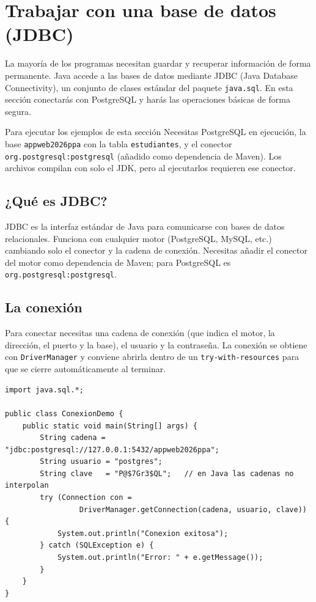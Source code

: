 \documentclass[11pt]{article}
\begin{document}
\section{Trabajar con una base de datos (JDBC)}
La mayoría de los programas necesitan guardar y recuperar información de forma permanente. Java accede a las bases de datos mediante JDBC (Java Database Connectivity), un conjunto de clases estándar del paquete \texttt{java.\allowbreak{}sql}. En esta sección conectarás con PostgreSQL y harás las operaciones básicas de forma segura.

\begin{cajawarn}{Para ejecutar los ejemplos de esta sección}
Necesitas PostgreSQL en ejecución, la base \texttt{appweb2026ppa} con la tabla \texttt{estudiantes}, y el conector \texttt{org.\allowbreak{}postgresql:\allowbreak{}postgresql} (añadido como dependencia de Maven). Los archivos compilan con solo el JDK, pero al ejecutarlos requieren ese conector.\par
\end{cajawarn}
\subsection{¿Qué es JDBC?}
JDBC es la interfaz estándar de Java para comunicarse con bases de datos relacionales. Funciona con cualquier motor (PostgreSQL, MySQL, etc.) cambiando solo el conector y la cadena de conexión. Necesitas añadir el conector del motor como dependencia de Maven; para PostgreSQL es \texttt{org.\allowbreak{}postgresql:\allowbreak{}postgresql}.

\subsection{La conexión}
Para conectar necesitas una cadena de conexión (que indica el motor, la dirección, el puerto y la base), el usuario y la contraseña. La conexión se obtiene con \texttt{Driver\allowbreak{}Manager} y conviene abrirla dentro de un \texttt{try-with-resources} para que se cierre automáticamente al terminar.

\begin{cajacodigo}
\begin{lstlisting}[style=java]
import java.sql.*;

public class ConexionDemo {
    public static void main(String[] args) {
        String cadena = "jdbc:postgresql://127.0.0.1:5432/appweb2026ppa";
        String usuario = "postgres";
        String clave   = "P@$7Gr3$QL";   // en Java las cadenas no interpolan
        try (Connection con =
                 DriverManager.getConnection(cadena, usuario, clave)) {
            System.out.println("Conexion exitosa");
        } catch (SQLException e) {
            System.out.println("Error: " + e.getMessage());
        }
    }
}
\end{lstlisting}
\end{cajacodigo}
\vspace{2pt}
\end{document}

